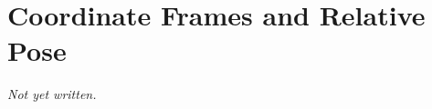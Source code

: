 \section{Coordinate Frames and Relative Pose}\label{sec:pl:coordinate-frames}

\emph{Not yet written.}
